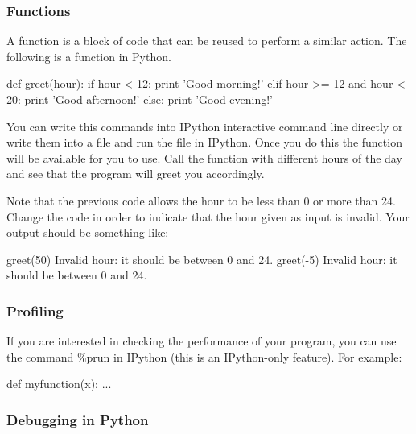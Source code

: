  
\subsubsection{Functions}

A function is a block of code that can be reused to perform a similar action. The following is a function in Python. 

\begin{python}
def greet(hour):
    if hour < 12:
        print 'Good morning!'
    elif hour >= 12 and hour < 20:
        print 'Good afternoon!'
    else:
        print 'Good evening!'
\end{python}

You can write this commands into IPython interactive command line directly or write them into a file and run the file in IPython. Once you do this the function will be available for you to use. Call the function  with different hours of the day and see that the program will greet you accordingly.

\begin{exercise}
Note that the previous code allows the hour to be less than 0 or more than 24. Change the code in order to indicate that the hour given as input is invalid. Your output should be something like:

\begin{python}
greet(50)
Invalid hour: it should be between 0 and 24.
greet(-5)
Invalid hour: it should be between 0 and 24.
\end{python}

\end{exercise}

\subsubsection{Profiling}

If you are interested in checking the performance of your program, you can use the command \%prun in IPython (this is an IPython-only feature). For example:

\begin{python}
def myfunction(x):
    ...

\end{python}

\subsubsection{Debugging in Python}

